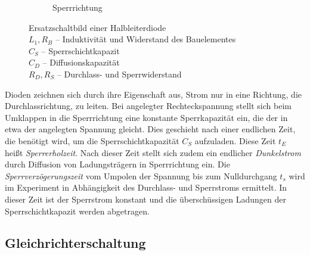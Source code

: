 \documentclass[10pt,a4paper]{scrartcl}
\begin{document}
\begin{figure}[!ht]
\begin{subfigure}{\textwidth}
        \caption{Sperrrichtung}
    \end{subfigure}
    \caption[Ersatzschaltbild einer Halbleiterdiode]
    {Ersatzschaltbild einer Halbleiterdiode\\
    $L_1,R_B$ -- Induktivität und Widerstand des Bauelementes\\
    $C_S$ -- Sperrschichtkapazit\\
    $C_D$ -- Diffusionskapazität\\
    $R_D,R_S$ -- Durchlass- und Sperrwiderstand}
    \label{fig:HL_Ersatz}
\end{figure}

Dioden zeichnen sich durch ihre Eigenschaft aus, Strom nur in eine Richtung,
die Durchlassrichtung, zu leiten.
Bei angelegter Rechteckspannung stellt sich beim Umklappen in die Sperrrichtung
eine konstante Sperrkapazität ein, die der in etwa der angelegten Spannung
gleicht.
Dies geschieht nach einer endlichen Zeit, die benötigt wird,
um die Sperrschichtkapazität $C_S$ aufzuladen.
Diese Zeit $t_E$ heißt \emph{Sperrerholzeit}.
Nach dieser Zeit stellt sich zudem ein endlicher \emph{Dunkelstrom} durch
Diffusion von Ladungsträgern in Sperrrichtung ein.
Die \emph{Sperrverzögerungszeit} vom Umpolen der Spannung bis zum
Nulldurchgang $t_s$ wird im Experiment in Abhängigkeit des Durchlass- und
Sperrstroms ermittelt.
In dieser Zeit ist der Sperrstrom konstant und die überschüssigen Ladungen
der Sperrschichtkapazit werden abgetragen.

\subsection {Gleichrichterschaltung}
\end{document}
